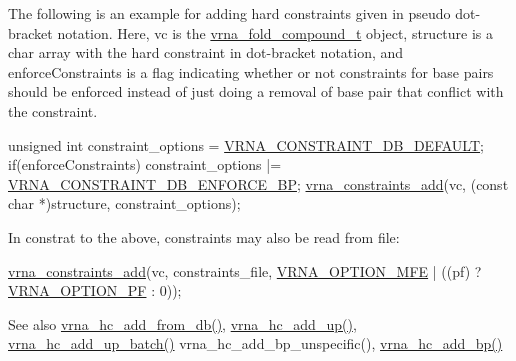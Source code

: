 The following is an example for adding hard constraints given in pseudo dot-\/bracket notation. Here, {\ttfamily vc} is the \hyperlink{group__fold__compound_ga1b0cef17fd40466cef5968eaeeff6166}{vrna\+\_\+fold\+\_\+compound\+\_\+t} object, {\ttfamily structure} is a char array with the hard constraint in dot-\/bracket notation, and {\ttfamily enforce\+Constraints} is a flag indicating whether or not constraints for base pairs should be enforced instead of just doing a removal of base pair that conflict with the constraint.


\begin{DoxyCodeInclude}
          \textcolor{keywordtype}{unsigned} \textcolor{keywordtype}{int} constraint\_options = \hyperlink{group__hard__constraints_ga1c3864bdc92147a4d93de2b1b4356177}{VRNA\_CONSTRAINT\_DB\_DEFAULT};
          \textcolor{keywordflow}{if}(enforceConstraints)
            constraint\_options |= \hyperlink{group__hard__constraints_ga29ebe940110d60ab798fdacbcdbbfb7d}{VRNA\_CONSTRAINT\_DB\_ENFORCE\_BP};
          \hyperlink{group__constraints_ga35a401f680969a556858a8dd5f1d07cc}{vrna\_constraints\_add}(vc, (\textcolor{keyword}{const} \textcolor{keywordtype}{char} *)structure, constraint\_options);
\end{DoxyCodeInclude}
 In constrat to the above, constraints may also be read from file\+:


\begin{DoxyCodeInclude}
        \hyperlink{group__constraints_ga35a401f680969a556858a8dd5f1d07cc}{vrna\_constraints\_add}(vc, constraints\_file, 
      \hyperlink{group__fold__compound_gae63be9127fe7dcc1f9bb14f5bb1064ee}{VRNA\_OPTION\_MFE} | ((pf) ? \hyperlink{group__fold__compound_gabfbadcddda3e74ce7f49035ef8f058f7}{VRNA\_OPTION\_PF} : 0));
\end{DoxyCodeInclude}
 \begin{DoxySeeAlso}{See also}
\hyperlink{group__hard__constraints_ga5b4de3247b67358080c176b94591a8e6}{vrna\+\_\+hc\+\_\+add\+\_\+from\+\_\+db()}, \hyperlink{group__hard__constraints_gaeb352e3e6ccd2b567bafa451365bb545}{vrna\+\_\+hc\+\_\+add\+\_\+up()}, \hyperlink{group__hard__constraints_ga5070f296c8af2baea10951525519464f}{vrna\+\_\+hc\+\_\+add\+\_\+up\+\_\+batch()} vrna\+\_\+hc\+\_\+add\+\_\+bp\+\_\+unspecific(), \hyperlink{group__hard__constraints_gac49305fc5c7d8653c5fbd2de1e1615e2}{vrna\+\_\+hc\+\_\+add\+\_\+bp()}
\end{DoxySeeAlso}


